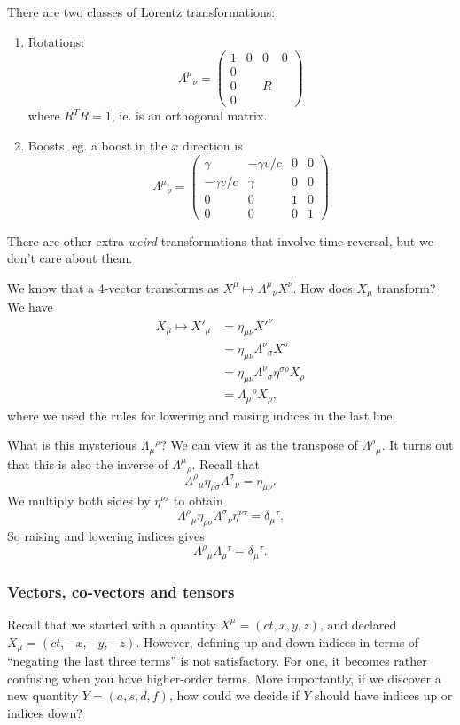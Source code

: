 \documentclass[a4paper]{article}
\begin{document}
There are two classes of Lorentz transformations:
\begin{enumerate}
  \item Rotations:
    \[
      \Lambda^\mu\!_\nu =
      \begin{pmatrix}
        1 & 0 & 0 & 0\\
        0 & \\
        0 & & R \\
        0
      \end{pmatrix}
    \]
    where $R^TR = 1$, ie. is an orthogonal matrix.
  \item Boosts, eg. a boost in the $x$ direction is
    \[
      \Lambda^\mu\!_\nu =
      \begin{pmatrix}
        \gamma & -\gamma v/c & 0 &0\\
        -\gamma v/c & \gamma & 0 & 0\\
        0 & 0 & 1 & 0\\
        0 & 0 & 0 & 1
      \end{pmatrix}
    \]
\end{enumerate}
There are other extra \emph{weird} transformations that involve time-reversal, but we don't care about them.

We know that a 4-vector transforms as $X^\mu \mapsto \Lambda^\mu\!_\nu X^\nu$. How does $X_\mu$ transform? We have
\begin{align*}
  X_\mu \mapsto X'_\mu &= \eta_{\mu\nu}X'^\nu\\
  &= \eta_{\mu\nu}\Lambda^\nu\!_\sigma X^\sigma\\
  &= \eta_{\mu\nu}\Lambda^\nu\!_\sigma\eta^{\sigma\rho}X_\rho\\
  &= \Lambda_\mu\!^\rho X_\rho,
\end{align*}
where we used the rules for lowering and raising indices in the last line.

What is this mysterious $\Lambda_\mu\!^\rho$? We can view it as the transpose of $\Lambda^\rho\!_\mu$. It turns out that this is also the inverse of $\Lambda^\mu\!_\rho$. Recall that
\[
  \Lambda^\rho\!_\mu\eta_{\rho\sigma} \Lambda^\sigma\!_\nu = \eta_{\mu\nu}.
\]
We multiply both sides by $\eta^{\nu\tau}$ to obtain
\[
  \Lambda^\rho\!_\mu\eta_{\rho\sigma} \Lambda^\sigma\!_\nu\eta^{\nu\tau} = \delta_\mu\!^\tau.
\]
So raising and lowering indices gives
\[
  \Lambda^\rho\!_\mu \Lambda_\rho\!^\tau = \delta_\mu\!^\tau.
\]
\subsubsection{Vectors, co-vectors and tensors}
Recall that we started with a quantity $X^\mu = (ct, x, y, z)$, and declared $X_\mu = (ct, -x, -y, -z)$. However, defining up and down indices in terms of ``negating the last three terms'' is not satisfactory. For one, it becomes rather confusing when you have higher-order terms. More importantly, if we discover a new quantity $Y = (a, s, d, f)$, how could we decide if $Y$ should have indices up or indices down?
\end{document}
